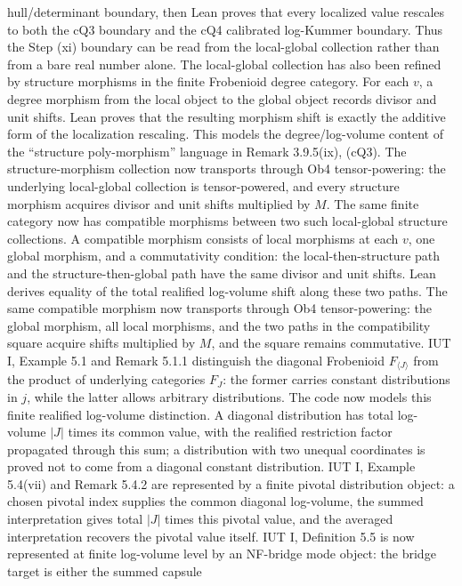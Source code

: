 \documentclass[11pt]{article}
\newcommand{\IUT}{IUT}
\newcommand{\Lean}{Lean}
\theoremstyle{plain}
\theoremstyle{definition}
\theoremstyle{remark}
\begin{document}
hull/determinant boundary, then \Lean{} proves that every localized value
rescales to both the cQ3 boundary and the cQ4 calibrated log-Kummer boundary.
Thus the Step (xi) boundary can be read from the local-global collection rather
than from a bare real number alone.
The local-global collection has also been refined by structure morphisms in
the finite Frobenioid degree category.  For each \(v\), a degree morphism from
the local object to the global object records divisor and unit shifts.
\Lean{} proves that the resulting morphism shift is exactly the additive form
of the localization rescaling.  This models the degree/log-volume content of
the ``structure poly-morphism'' language in Remark 3.9.5(ix), (cQ3).  The
structure-morphism collection now transports through Ob4 tensor-powering:
the underlying local-global collection is tensor-powered, and every structure
morphism acquires divisor and unit shifts multiplied by \(M\).
The same finite category now has compatible morphisms between two such
local-global structure collections.  A compatible morphism consists of local
morphisms at each \(v\), one global morphism, and a commutativity condition:
the local-then-structure path and the structure-then-global path have the same
divisor and unit shifts.  \Lean{} derives equality of the total realified
log-volume shift along these two paths.  The same compatible morphism now
transports through Ob4 tensor-powering: the global morphism, all local
morphisms, and the two paths in the compatibility square acquire shifts
multiplied by \(M\), and the square remains commutative.
\IUT{} I, Example 5.1 and Remark 5.1.1 distinguish the diagonal Frobenioid
\(F_{\langle J\rangle}\) from the product of underlying categories \(F_J\):
the former carries constant distributions in \(j\), while the latter allows
arbitrary distributions.  The code now models this finite realified
log-volume distinction.  A diagonal distribution has total log-volume
\(|J|\) times its common value, with the realified restriction factor
propagated through this sum; a distribution with two unequal coordinates is
proved not to come from a diagonal constant distribution.
\IUT{} I, Example 5.4(vii) and Remark 5.4.2 are represented by a finite
pivotal distribution object: a chosen pivotal index supplies the common
diagonal log-volume, the summed interpretation gives total
\(|J|\) times this pivotal value, and the averaged interpretation recovers the
pivotal value itself.
\IUT{} I, Definition 5.5 is now represented at finite log-volume level by an
NF-bridge mode object: the bridge target is either the summed capsule
\end{document}
